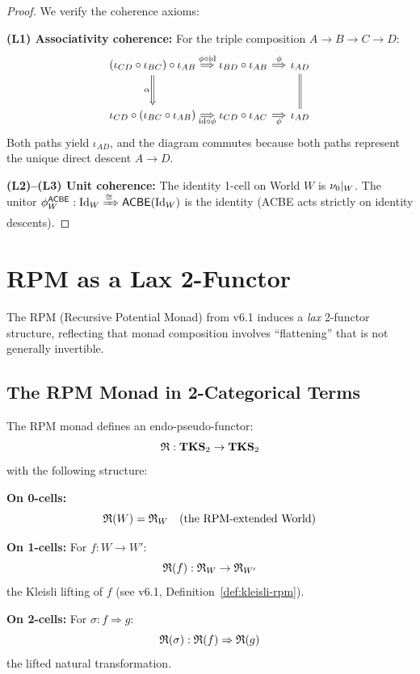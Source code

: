 \begin{proof}
We verify the coherence axioms:

\textbf{(L1) Associativity coherence:} For the triple composition $A \to B \to C \to D$:
\[
\begin{tikzcd}[column sep=small, row sep=large]
  (\iota_{CD} \circ \iota_{BC}) \circ \iota_{AB}
    \arrow[r, Rightarrow, "\phi \circ \mathrm{id}"]
    \arrow[d, Rightarrow, "\alpha"']
  &
  \iota_{BD} \circ \iota_{AB}
    \arrow[r, Rightarrow, "\phi"]
  &
  \iota_{AD}
    \arrow[d, equal]
  \\
  \iota_{CD} \circ (\iota_{BC} \circ \iota_{AB})
    \arrow[r, Rightarrow, "\mathrm{id} \circ \phi"']
  &
  \iota_{CD} \circ \iota_{AC}
    \arrow[r, Rightarrow, "\phi"']
  &
  \iota_{AD}
\end{tikzcd}
\]
Both paths yield $\iota_{AD}$, and the diagram commutes because both paths
represent the unique direct descent $A \to D$.

\textbf{(L2)--(L3) Unit coherence:} The identity 1-cell on World $W$ is $\nu_{0}|_W$.
The unitor $\phi^{\mathsf{ACBE}}_W : \mathrm{Id}_W \xRightarrow{\cong} \mathsf{ACBE}(\mathrm{Id}_W)$
is the identity (ACBE acts strictly on identity descents).
\end{proof}

\section{RPM as a Lax 2-Functor}
\label{sec:rpm-lax-functor}

The RPM (Recursive Potential Monad) from v6.1 induces a \emph{lax} 2-functor
structure, reflecting that monad composition involves ``flattening'' that
is not generally invertible.

\subsection{The RPM Monad in 2-Categorical Terms}

\begin{definition}
\label{def:rpm-endo}
The RPM monad defines an endo-pseudo-functor:
\[
  \mathfrak{R} : \mathbf{TKS}_2 \to \mathbf{TKS}_2
\]
with the following structure:

\textbf{On 0-cells:}
\[
  \mathfrak{R}(W) = \mathfrak{R}_W \quad \text{(the RPM-extended World)}
\]

\textbf{On 1-cells:} For $f : W \to W'$:
\[
  \mathfrak{R}(f) : \mathfrak{R}_W \to \mathfrak{R}_{W'}
\]
the Kleisli lifting of $f$ (see v6.1, Definition~\ref{def:kleisli-rpm}).

\textbf{On 2-cells:} For $\sigma : f \Rightarrow g$:
\[
  \mathfrak{R}(\sigma) : \mathfrak{R}(f) \Rightarrow \mathfrak{R}(g)
\]
the lifted natural transformation.
\end{definition}


